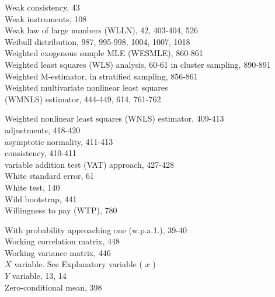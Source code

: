 \documentclass[10pt]{article}
\begin{document}
Weak consistency, 43\\
Weak instruments, 108\\
Weak law of large numbers (WLLN), 42, 403-404, 526\\
Weibull distribution, 987, 995-998, 1004, 1007, 1018\\
Weighted exogenous sample MLE (WESMLE), 860-861\\
Weighted least squares (WLS) analysis, 60-61 in cluster sampling, 890-891\\
Weighted M-estimator, in stratified sampling, 856-861\\
Weighted multivariate nonlinear least squares\\
(WMNLS) estimator, 444-449, 614, 761-762

Weighted nonlinear least squares (WNLS) estimator, 409-413\\
adjustments, 418-420\\
asymptotic normality, 411-413\\
consistency, 410-411\\
variable addition test (VAT) approach, 427-428\\
White standard error, 61\\
White test, 140\\
Wild bootstrap, 441\\
Willingness to pay (WTP), 780

With probability approaching one (w.p.a.1.), 39-40\\
Working correlation matrix, 448\\
Working variance matrix, 446\\
$X$ variable. See Explanatory variable ( $x$ )\\
$Y$ variable, 13, 14\\
Zero-conditional mean, 398
\end{document}
